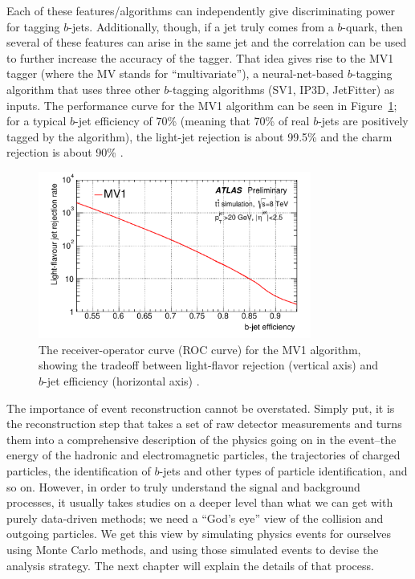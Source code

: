 Each of these features/algorithms can independently give discriminating power for tagging $b$-jets.
Additionally, though, if a jet truly comes from a $b$-quark, then several of these features can arise in the 
same jet and the correlation can be used to further increase the accuracy of the tagger.  That idea gives 
rise to the MV1 tagger (where the MV stands for ``multivariate''), a neural-net-based 
$b$-tagging algorithm that uses three other $b$-tagging algorithms (SV1, IP3D, JetFitter) 
as inputs.   The performance curve for the MV1 algorithm can be seen in Figure~\ref{fig:mv1_roc}; 
for a typical $b$-jet efficiency of 70\% (meaning that 70\% of real $b$-jets 
are positively tagged by the algorithm), the light-jet rejection is about 99.5\% and the 
charm rejection is about 90\% \cite{b-tagging}.


\begin{figure}
    \center
	\includegraphics[width=0.8\textwidth]{ReconstructionPerformance/images/mv1_roc.pdf}
	\caption{The receiver-operator curve (ROC curve) for the MV1 algorithm, showing the tradeoff
    between light-flavor rejection (vertical axis) and $b$-jet efficiency (horizontal axis)
     \cite{b-tagging}.	\label{fig:mv1_roc}  }
\end{figure}


The importance of event reconstruction cannot be overstated.  Simply 
put, it is the reconstruction step that takes a set of raw detector 
measurements and turns them into a comprehensive description of the 
physics going on in the event--the energy of the hadronic and electromagnetic
particles, the trajectories of charged particles, the identification of 
$b$-jets and other types of particle identification, and so on.  However,
in order to truly understand the signal and background processes, it usually
takes studies on a deeper level than what we can get with purely data-driven methods;
we need a ``God's eye'' view of the collision and outgoing particles.  
We get this view by simulating physics events for ourselves using Monte Carlo
methods, and using those simulated events to devise the analysis strategy.
The next chapter will explain the details of that process.












